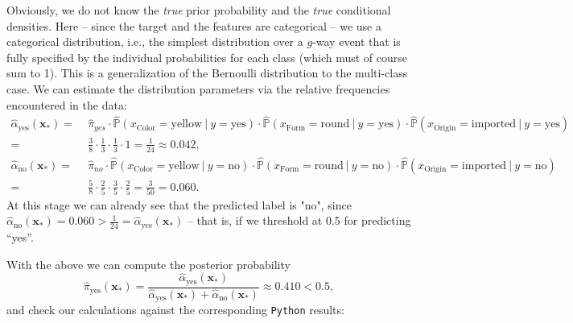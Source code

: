 \documentclass[11pt]{article}
\renewcommand{\P}{\mathds{P}} %
\newcommand{\xv}{\mathbf{x}} %
\begin{document}
	Obviously, we do not know the \emph{true} prior probability and the 
	\emph{true} conditional densities. 
	Here -- since the target and the features are 
	categorical -- we use a categorical distribution, i.e., the 
	simplest distribution over a $g$-way event that is fully specified by the 
	individual probabilities for each class (which must of course sum to 1).
	This is a generalization of the Bernoulli distribution to the multi-class 
	case.
	We can estimate the distribution parameters via the relative frequencies 
	encountered in the data:
	\begin{align*}
		\hat{\alpha}_\text{yes}(\xv_{\ast}) = 
		& \;  \hat{\pi}_{yes} \cdot 
		\hat{\P}(x_\text{Color} = \text{yellow} ~|~ y = \text{yes}) \cdot 
		\hat{\P}(x_\text{Form} = \text{round} ~|~ y = \text{yes}) \cdot 
		\hat{\P}(x_\text{Origin} = \text{imported} ~|~ y = \text{yes}) \\
		= & \; \frac{3}{8} \cdot \frac{1}{3} \cdot \frac{1}{3} \cdot 1 = \frac{1}{24} 
		\approx 0.042, \\
		\hat{\alpha}_\text{no}(\xv_{\ast}) = & \;  \hat{\pi}_{no} \cdot 
		\hat{\P}(x_\text{Color} = \text{yellow} ~|~ y = \text{no})\cdot 
		\hat{\P}(x_\text{Form} = \text{round} ~|~ y = \text{no}) \cdot 
		\hat{\P}(x_\text{Origin} = \text{imported} ~|~ y = \text{no}) \\
		= & \; \frac{5}{8} \cdot \frac{2}{5} \cdot \frac{3}{5} \cdot \frac{2}{5} = 
		\frac{3}{50} = 0.060.
	\end{align*}
	At this stage we can already see that the predicted label is "no", since 
	$\hat{\alpha}_\text{no}(\xv_{\ast}) = 0.060 > \frac{1}{24} = 
	\hat{\alpha}_\text{yes}(\xv_{\ast})$ -- that is, if we threshold at 0.5 for 
	predicting \enquote{yes}.
	
	With the above we can compute the posterior probability
	$$\hat{\pi}_\text{yes}(\xv_{\ast}) = \frac{\hat{\alpha}_\text{yes}(
		\xv_{\ast})}{\hat{\alpha}_\text{yes}(\xv_{\ast}) + 
		\hat{\alpha}_\text{no}(\xv_{\ast})} \approx 0.410 < 0.5,$$
	and check our calculations against the corresponding \texttt{Python} results:
\end{document}
